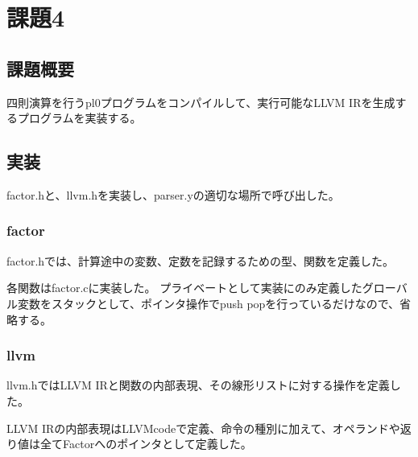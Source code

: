 \section{課題4}
\subsection{課題概要}
四則演算を行うpl0プログラムをコンパイルして、実行可能なLLVM IRを生成するプログラムを実装する。

\subsection{実装}
factor.hと、llvm.hを実装し、parser.yの適切な場所で呼び出した。

\subsubsection{factor}
factor.hでは、計算途中の変数、定数を記録するための型、関数を定義した。


各関数はfactor.cに実装した。
プライベートとして実装にのみ定義したグローバル変数をスタックとして、ポインタ操作でpush popを行っているだけなので、省略する。

\subsubsection{llvm}
llvm.hではLLVM IRと関数の内部表現、その線形リストに対する操作を定義した。

LLVM IRの内部表現はLLVMcodeで定義、命令の種別に加えて、オペランドや返り値は全てFactorへのポインタとして定義した。

